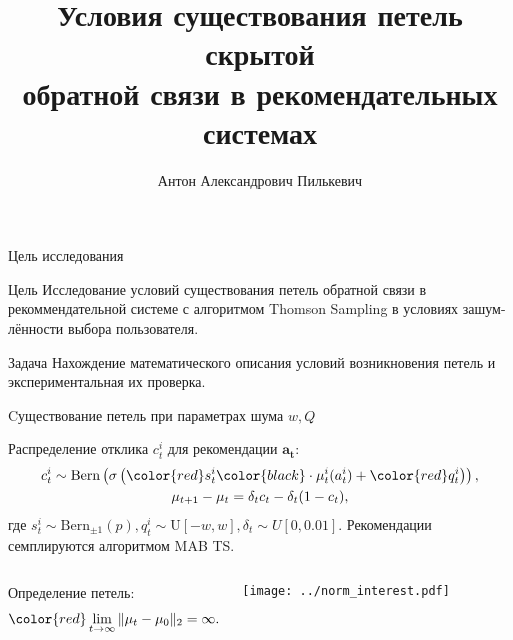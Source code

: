 \documentclass{beamer}
\title[\hbox to 56mm{Петли скрытой обратной связи}]{ Условия существования петель скрытой \\ обратной связи в рекомендательных системах }
\author[А.\,А. Пилькевич]{Антон Александрович Пилькевич}
\institute{Московский физико-технический институт}
\date{\footnotesize
\par\smallskip\emph{Курс:} Автоматизация научных исследований\par (практика, В.\,В.~Стрижов)/Группа 813
\par\smallskip\emph{Эксперт:} А.\,С.~Хританков
\par\smallskip\emph{Консультант:} А.\,С.~Хританков
\par\bigskip\small 2021}
\begin{document}
\begin{frame}
\thispagestyle{empty}
\maketitle
\end{frame}
\begin{frame}{Цель исследования}
\begin{block}{Цель}
  Исследование условий существования петель обратной
связи в рекоммендательной системе с алгоритмом Thomson Sampling в условиях зашум-
лённости выбора пользователя.
\end{block}
\begin{block}{Задача}
  Нахождение математического описания условий возникновения петель и экспериментальная их проверка. 
\end{block}
\end{frame}
\begin{frame}{Cуществование петель при параметрах шума $w, Q$}

Распределение отклика $c_t^i$ для рекомендации $\mathbf{a_t}$:
\begin{gather*}
    c_t^i \sim \text{Bern} \left(\sigma\left( \color{red} s_t^i \color{black} \cdot \mu_t^i (a_t^i) + \mathbin{\color{red} q_t^i } \right) \right), \\ 
    \mu_{t+1} - \mu_{t} = \delta_t c_t - \delta_t (1 - c_t), 
\end{gather*}
где $s_t^i \sim \text{Bern}_{\pm 1}(p), q_t^i \sim \text{U}[-w, w], \delta_t \sim U[0, 0.01].$
Рекомендации семплируются алгоритмом MAB TS.

\begin{columns}[c]
Определение петель: 
\begin{gather*}
  \color{red} \lim_{t \to \infty} \|\mu_t - \mu_0 \|_2 = \infty.
\end{gather*}
\begin{center}
  \texttt{[image: ../norm\_interest.pdf]}
\end{center}
\end{columns}
\end{frame}
\end{document}
